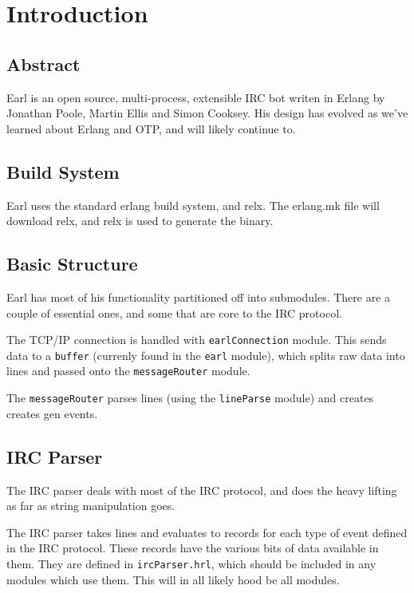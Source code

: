 \documentclass[12pt]{article}
\begin{document}

\section*{Introduction}

\subsection*{Abstract}

Earl is an open source, multi-process, extensible IRC bot writen in Erlang by
Jonathan Poole, Martin Ellis and Simon Cooksey.  His design has evolved as we've
learned about Erlang and OTP, and will likely continue to.

\subsection*{Build System}

Earl uses the standard erlang build system, and relx. The erlang.mk file will
download relx, and relx is used to generate the binary.


\subsection*{Basic Structure}

Earl has most of his functionality partitioned off into submodules. There are a
couple of essential ones, and some that are core to the IRC protocol.

The TCP/IP connection is handled with \texttt{earlConnection} module. This sends
data to a \texttt{buffer} (currenly found in the \texttt{earl} module), which
splits raw data into lines and passed onto the \texttt{messageRouter} module.

The \texttt{messageRouter} parses lines (using the \texttt{lineParse} module)
and creates creates gen events.

\subsection*{IRC Parser}

The IRC parser deals with most of the IRC protocol, and does the heavy lifting
as far as string manipulation goes.

The IRC parser takes lines and evaluates to records for each type of event 
defined in the IRC protocol. These records have the various bits of data 
available in them. They are defined in \texttt{ircParser.hrl}, which should be
included in any modules which use them. This will in all likely hood be all 
modules.
\end{document}

